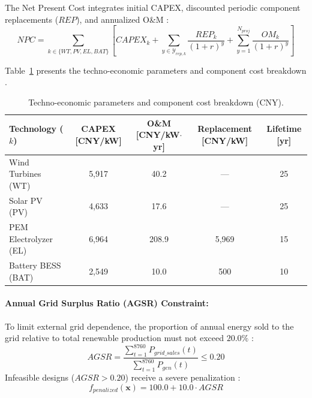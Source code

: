 \documentclass[review]{elsarticle}
\begin{document}
The Net Present Cost integrates initial CAPEX, discounted periodic component replacements ($REP$), and annualized O\&M \cite{li2024capacity}:
\begin{equation}
NPC = \sum_{k \in \{WT, PV, EL, BAT\}} \left[ CAPEX_k + \sum_{y \in \mathcal{Y}_{rep,k}} \frac{REP_k}{(1+r)^y} + \sum_{y=1}^{N_{proj}} \frac{OM_k}{(1+r)^y} \right]
\label{eq:npc_formulation}
\end{equation}

Table~\ref{tab:hres2_costs} presents the techno-economic parameters and component cost breakdown \cite{li2024capacity}.

\begin{table}[htbp]
\centering
\scriptsize
\caption{Techno-economic parameters and component cost breakdown (CNY).}
\label{tab:hres2_costs}
\begin{tabular}{lcccc}
\toprule
\textbf{Technology ($k$)} & \textbf{CAPEX [CNY/kW]} & \textbf{O\&M [CNY/kW$\cdot$yr]} & \textbf{Replacement [CNY/kW]} & \textbf{Lifetime [yr]} \\
\midrule
Wind Turbines (WT) & 5,917 & 40.2 & --- & 25 \\
Solar PV (PV) & 4,633 & 17.6 & --- & 25 \\
PEM Electrolyzer (EL) & 6,964 & 208.9 & 5,969 & 15 \\
Battery BESS (BAT) & 2,549 & 10.0 & 500 & 10 \\
\bottomrule
\end{tabular}
\end{table}

\paragraph{Annual Grid Surplus Ratio (AGSR) Constraint:}
To limit external grid dependence, the proportion of annual energy sold to the grid relative to total renewable production must not exceed $20.0\%$
\cite{thirunavukkarasu2023comprehensive}:
\begin{equation}
AGSR = \frac{\displaystyle\sum_{t=1}^{8760} P_{grid\_sales}(t)}{\displaystyle\sum_{t=1}^{8760} P_{gen}(t)} \le 0.20
\label{eq:agsr_constraint}
\end{equation}
Infeasible designs ($AGSR > 0.20$) receive a severe penalization \cite{modu2023systematic}:
\begin{equation}
f_{penalized}(\mathbf{x}) = 100.0 + 10.0 \cdot AGSR
\label{eq:penalty_function}
\end{equation}
\end{document}
